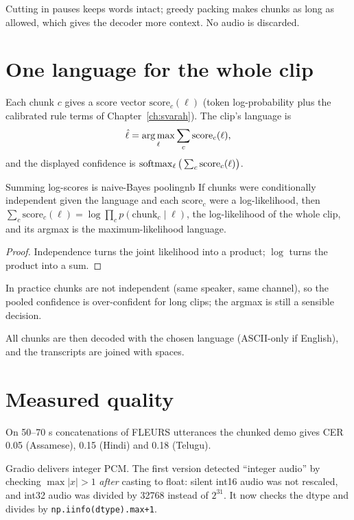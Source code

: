 Cutting in pauses keeps words intact; greedy packing makes chunks as long as allowed, which gives the decoder more context. No audio
is discarded.

\section{One language for the whole clip}

Each chunk $c$ gives a score vector $\mathrm{score}_c(\ell)$ (token log-probability plus the calibrated rule terms of
Chapter~\ref{ch:svarah}). The clip's language is
\[
\hat\ell=\operatorname*{arg\,max}_\ell\sum_c\mathrm{score}_c(\ell),
\]
and the displayed confidence is $\operatorname{softmax}_\ell\big(\sum_c\mathrm{score}_c(\ell)\big)$.

\begin{proposition}{Summing log-scores is naive-Bayes pooling}{nb}
If chunks were conditionally independent given the language and each $\mathrm{score}_c$ were a log-likelihood, then
$\sum_c\mathrm{score}_c(\ell)=\log\prod_cp(\text{chunk}_c\mid\ell)$, the log-likelihood of the whole clip, and its argmax is the
maximum-likelihood language.
\end{proposition}
\begin{proof}
Independence turns the joint likelihood into a product; $\log$ turns the product into a sum.
\end{proof}
In practice chunks are not independent (same speaker, same channel), so the pooled confidence is over-confident for long clips; the
argmax is still a sensible decision.

All chunks are then decoded with the chosen language (ASCII-only if English), and the transcripts are joined with spaces.

\section{Measured quality}

On 50--70 s concatenations of FLEURS utterances the chunked demo gives CER 0.05 (Assamese), 0.15 (Hindi) and 0.18 (Telugu).

\begin{vivatip}
Gradio delivers integer PCM. The first version detected ``integer audio'' by checking $\max|x|>1$ \emph{after} casting to float:
silent int16 audio was not rescaled, and int32 audio was divided by 32768 instead of $2^{31}$. It now checks the dtype and divides by
\texttt{np.iinfo(dtype).max+1}.
\end{vivatip}
